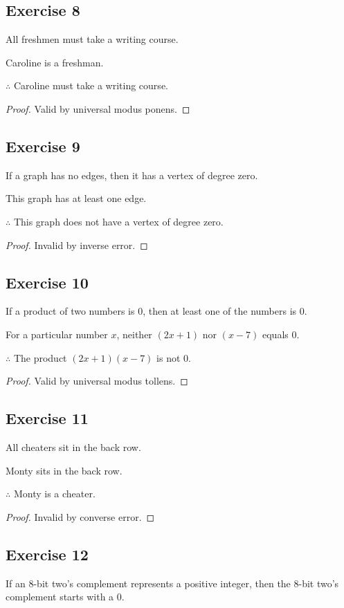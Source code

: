 \documentclass[14pt]{extarticle}
\begin{document}
\subsection{Exercise 8}
All freshmen must take a writing course.

Caroline is a freshman.

$\therefore$ Caroline must take a writing course.

\begin{proof}
    Valid by universal modus ponens.
\end{proof}

\subsection{Exercise 9}
If a graph has no edges, then it has a vertex of degree zero.

This graph has at least one edge.

$\therefore$ This graph does not have a vertex of degree zero.

\begin{proof}
    Invalid by inverse error.
\end{proof}

\subsection{Exercise 10}
If a product of two numbers is 0, then at least one of the numbers is 0.

For a particular number $x$, neither $(2x + 1)$ nor $(x - 7)$ equals 0.

$\therefore$ The product $(2x + 1)(x - 7)$ is not 0.

\begin{proof}
    Valid by universal modus tollens.
\end{proof}

\subsection{Exercise 11}
All cheaters sit in the back row.

Monty sits in the back row.

$\therefore$ Monty is a cheater.

\begin{proof}
    Invalid by converse error.
\end{proof}

\subsection{Exercise 12}
If an 8-bit two’s complement represents a positive integer, then the 8-bit two’s complement starts with a 0.
\end{document}
